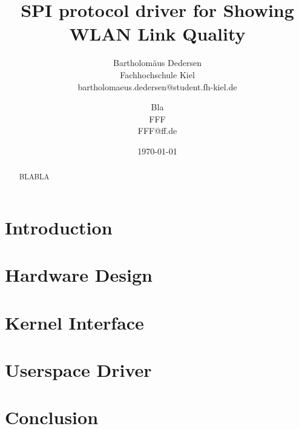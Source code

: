 \documentclass[bibtotocnumbered, headsepline,normalheadings]{report}
\begin{document}
\author{ 
Bartholomäus Dedersen \\ Fachhochschule Kiel \\ bartholomaeus.dedersen@student.fh-kiel.de \and
Bla \\ FFF \\ FFF@ff.de}

\date{\today} 
\title{SPI protocol driver for Showing WLAN Link Quality} 

\maketitle


\begin{abstract}

    BLABLA

\end{abstract}

\tableofcontents \newpage

\chapter{Introduction}



\chapter{Hardware Design}
\label{chap:hardware}



\chapter{Kernel Interface}
\label{chap:kernel}


\chapter{Userspace Driver}
\label{chap:userspace}


\chapter{Conclusion}
\label{chap:conclusion}



\nocite{*}


\listoffigures
\begingroup \let\clearpage\relax
\listoftables \endgroup
\end{document}
